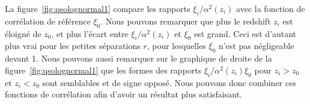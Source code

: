 La figure~\ref{fig:qsolognormal1} compare les rapports $\xi_i / \alpha^2(z_i)$ avec la fonction de corrélation de référence $\xi_0$.
Nous pouvons remarquer que plus le redshift $z_i$ est éloigné de $z_0$, et plus l'écart entre $\xi_i / \alpha^2(z_i)$ et $\xi_0$ est grand.
Ceci est d'autant plus vrai pour les petites séparations $r$, pour lesquelles $\xi_0$ n'est pas négligeable devant 1. %
Nous pouvons aussi remarquer sur le graphique de droite de la figure~\ref{fig:qsolognormal1} que les formes des rapports $\xi_i / \alpha^2(z_i)\xi_0$ pour $z_i > z_0$ et $z_i < z_0$ sont semblables et de signe opposé. Nous pouvons donc combiner ces fonctions de corrélation afin d'avoir un résultat plus satisfaisant.

